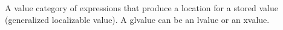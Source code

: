 


A value category of expressions that produce a location for a stored value (generalized localizable value). A glvalue can be an lvalue or an xvalue.